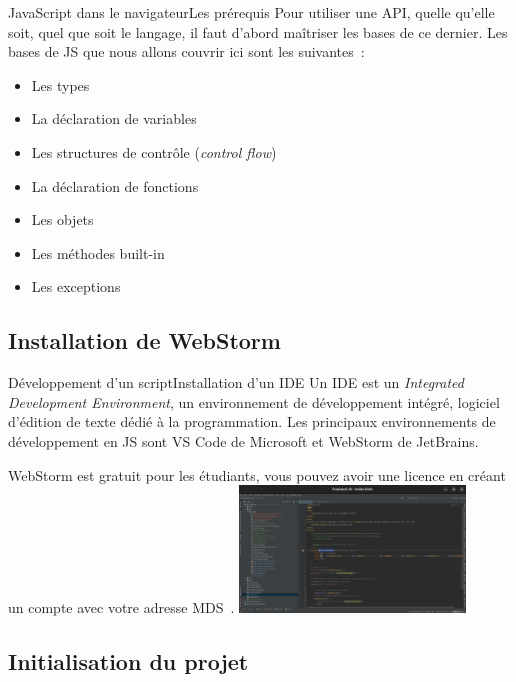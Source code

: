 \documentclass{beamer}
\begin{document}
    \begin{frame}{JavaScript dans le navigateur}{Les prérequis}
        Pour utiliser une API, quelle qu'elle soit, quel que soit le langage, il faut d'abord maîtriser les bases de ce dernier.
        \bigbreak
        Les bases de JS que nous allons couvrir ici sont les suivantes~:
        \begin{itemize}
            \item Les types
            \item La déclaration de variables
            \item Les structures de contrôle (\textit{control flow})
            \item La déclaration de fonctions
            \item Les objets
            \item Les méthodes built-in
            \item Les exceptions
        \end{itemize}
    \end{frame}

    \subsection{Installation de WebStorm}\label{subsec:installwebstorm}

    \begin{frame}{Développement d'un script}{Installation d'un IDE}
        Un IDE est un \textit{Integrated Development Environment}, un environnement de développement intégré, logiciel d'édition de texte dédié à la programmation.
        \bigbreak
        Les principaux environnements de développement en JS sont VS Code de Microsoft et WebStorm de JetBrains.

        WebStorm est gratuit pour les étudiants, vous pouvez avoir une licence en créant un compte avec votre adresse MDS~.
        \bigbreak
        \bigbreak
        \centering
        \includegraphics[width=6cm]{image/webstorm}
    \end{frame}

    \subsection{Initialisation du projet}\label{subsec:projectinit}
\end{document}
